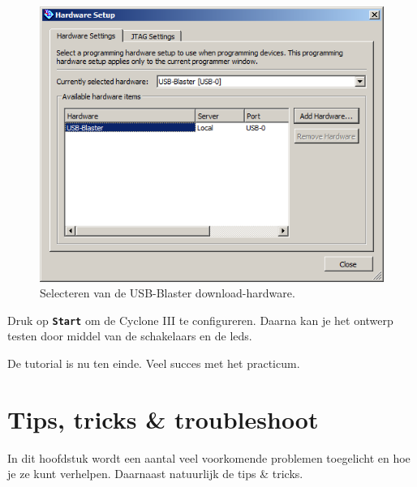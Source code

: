 \documentclass[a4paper,12pt,fleqn,twoside]{book}
\newif\ifbetaversion
\def\tutpicscale{0.455}
\newcommand{\knop}[1]{\texttt{\textbf{#1}}}
\begin{document}
\begin{figure}[H]
\centering
\includegraphics[scale=\tutpicscale]{055selectusbblaster}
\caption{Selecteren van de USB-Blaster download-hardware.}
\label{fig:055selectusbblaster}
\end{figure}

Druk op \knop{Start} om de Cyclone III te configureren. Daarna kan je het
ontwerp testen door middel van de schakelaars en de leds.

De tutorial is nu ten einde. Veel succes met het practicum.


\ifbetaversion

\chapter{Tips, tricks \& troubleshoot}
\label{chap:tipstrickstroubleshoot}
In dit hoofdstuk wordt een aantal veel voorkomende problemen toegelicht en hoe
je ze kunt verhelpen. Daarnaast natuurlijk de tips \& tricks.
\end{document}
